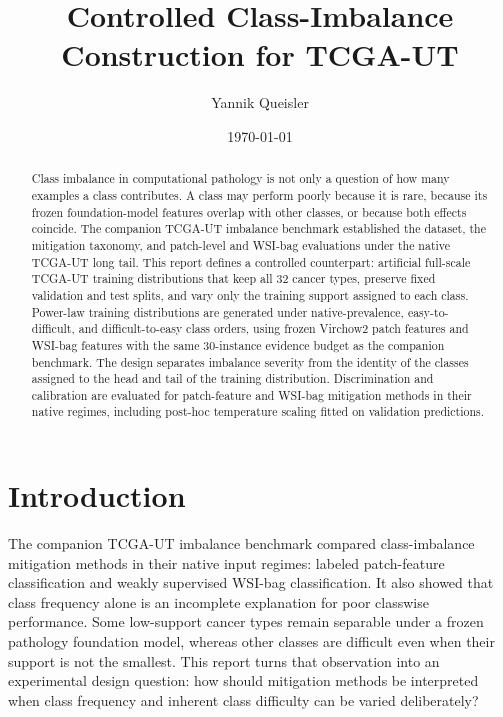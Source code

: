 \documentclass[11pt]{article}
\title{Controlled Class-Imbalance Construction for TCGA-UT}
\author{Yannik Queisler}
\date{\today}
\begin{document}
\maketitle

\begin{abstract}
\noindent Class imbalance in computational pathology is not only a question of how many examples a class contributes. A class may perform poorly because it is rare, because its frozen foundation-model features overlap with other classes, or because both effects coincide. The companion TCGA-UT imbalance benchmark established the dataset, the mitigation taxonomy, and patch-level and WSI-bag evaluations under the native TCGA-UT long tail. This report defines a controlled counterpart: artificial full-scale TCGA-UT training distributions that keep all 32 cancer types, preserve fixed validation and test splits, and vary only the training support assigned to each class. Power-law training distributions are generated under native-prevalence, easy-to-difficult, and difficult-to-easy class orders, using frozen Virchow2 patch features and WSI-bag features with the same 30-instance evidence budget as the companion benchmark. The design separates imbalance severity from the identity of the classes assigned to the head and tail of the training distribution. Discrimination and calibration are evaluated for patch-feature and WSI-bag mitigation methods in their native regimes, including post-hoc temperature scaling fitted on validation predictions.
\end{abstract}

\setcounter{tocdepth}{2}
\tableofcontents
\clearpage

\section{Introduction}
The companion TCGA-UT imbalance benchmark compared class-imbalance mitigation methods in their native input regimes: labeled patch-feature classification and weakly supervised WSI-bag classification. It also showed that class frequency alone is an incomplete explanation for poor classwise performance. Some low-support cancer types remain separable under a frozen pathology foundation model, whereas other classes are difficult even when their support is not the smallest. This report turns that observation into an experimental design question: how should mitigation methods be interpreted when class frequency and inherent class difficulty can be varied deliberately?
\end{document}
